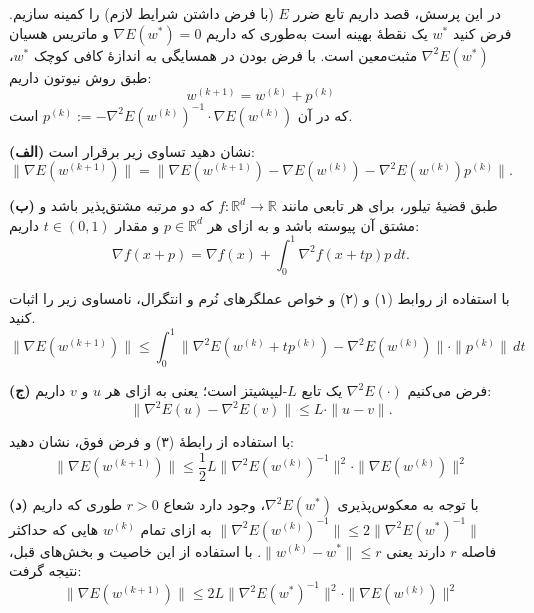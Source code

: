 در این پرسش، قصد داریم تابع ضرر $E$ (با فرض داشتن شرایط لازم) را کمینه سازیم. فرض کنید $w^*$ یک نقطهٔ بهینه است به‌طوری که داریم $\nabla E(w^*) = 0$ و ماتریس هسیان $\nabla^2 E(w^*)$ مثبت‌معین است. با فرض بودن در همسایگی به اندازهٔ کافی کوچک $w^*$، طبق روش نیوتون داریم:
\begin{equation*}
w^{(k+1)} = w^{(k)} + p^{(k)}
\end{equation*}
که در آن $p^{(k)} := - \nabla^2 E(w^{(k)})^{-1} \cdot \nabla E(w^{(k)})$ است.

\textbf{(الف)}
نشان دهید تساوی زیر برقرار است:
\begin{equation}
\|\nabla E(w^{(k+1)})\| = \|\nabla E(w^{(k+1)}) - \nabla E(w^{(k)}) - \nabla^2 E(w^{(k)})p^{(k)}\|.
\end{equation}

\textbf{(ب)}
طبق قضیهٔ تیلور، برای هر تابعی مانند $f : \mathbb{R}^d \to \mathbb{R}$ که دو مرتبه مشتق‌پذیر باشد و مشتق آن پیوسته باشد و به ازای هر $p \in \mathbb{R}^d$ و مقدار $t \in (0,1)$ داریم:
\begin{equation}
\nabla f(x+p) = \nabla f(x) + \int_0^1 \nabla^2 f(x+tp)p\, dt.
\end{equation}

با استفاده از روابط (۱) و (۲) و خواص عملگرهای نُرم و انتگرال، نامساوی زیر را اثبات کنید.
\begin{equation}
\|\nabla E(w^{(k+1)})\| \le \int_0^1 \|\nabla^2 E(w^{(k)}+tp^{(k)}) - \nabla^2 E(w^{(k)})\| \cdot \|p^{(k)}\|\, dt
\end{equation}

\textbf{(ج)}
فرض می‌کنیم $\nabla^2 E(\cdot)$ یک تابع $L$-لیپشیتز است؛ یعنی به ازای هر $u$ و $v$ داریم:
\begin{equation*}
\|\nabla^2 E(u) - \nabla^2 E(v)\| \le L \cdot \|u - v\|.
\end{equation*}

با استفاده از رابطهٔ (۳) و فرض فوق، نشان دهید:
\begin{equation*}
\|\nabla E(w^{(k+1)})\| \le \frac{1}{2} L \|\nabla^2 E(w^{(k)})^{-1}\|^2 \cdot \|\nabla E(w^{(k)})\|^2
\end{equation*}

\textbf{(د)}
با توجه به معکوس‌پذیری $\nabla^2 E(w^*)$، وجود دارد شعاع $r > 0$ طوری که داریم $\|\nabla^2 E(w^{(k)})^{-1}\| \le 2 \|\nabla^2 E(w^*)^{-1}\|$ به ازای تمام $w^{(k)}$ هایی که حداکثر فاصله $r$ دارند یعنی $\|w^{(k)} - w^*\| \le r$. با استفاده از این خاصیت و بخش‌های قبل، نتیجه گرفت:
\begin{equation}
\|\nabla E(w^{(k+1)})\| \le 2 L \|\nabla^2 E(w^*)^{-1}\|^2 \cdot \|\nabla E(w^{(k)})\|^2
\end{equation}

